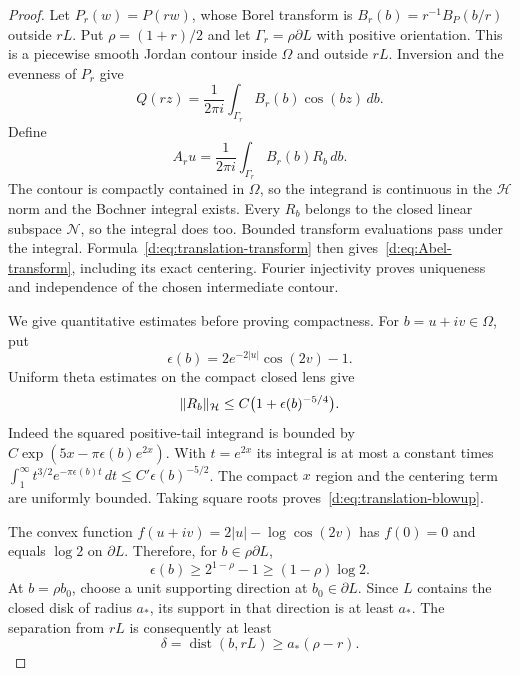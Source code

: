 \documentclass[11pt,a4paper]{article}
\numberwithin{equation}{section}
\theoremstyle{definition}\newtheorem{definition}[theorem]{Definition}
\theoremstyle{remark}\newtheorem{remark}[theorem]{Remark}
\newcommand{\Hh}{\mathcal H}\newcommand{\Hw}{\mathcal H}
\newcommand{\Nn}{\mathcal N}\newcommand{\Ii}{\mathcal I}\newcommand{\Zz}{\mathcal Z}
\begin{document}
\begin{proof}
Let $P_r(w)=P(rw)$, whose Borel transform is
$B_r(b)=r^{-1}B_P(b/r)$ outside $rL$. Put $\rho=(1+r)/2$ and let
$\Gamma_r=\rho\partial L$ with positive orientation. This is a piecewise smooth Jordan contour inside $\Omega$ and outside $rL$. Inversion and the evenness of $P_r$ give
\[
 Q(rz)=\frac1{2\pi i}\int_{\Gamma_r}B_r(b)\cos(bz)\,db.
\]
Define
\begin{equation}\label{d:eq:Abel-Bochner}
 A_ru=\frac1{2\pi i}\int_{\Gamma_r}B_r(b)R_b\,db.
\end{equation}
The contour is compactly contained in $\Omega$, so the integrand is continuous in the $\Hh$ norm and the Bochner integral exists. Every $R_b$ belongs to the closed linear subspace $\Nn$, so the integral does too. Bounded transform evaluations pass under the integral. Formula~\eqref{d:eq:translation-transform} then gives~\eqref{d:eq:Abel-transform}, including its exact centering. Fourier injectivity proves uniqueness and independence of the chosen intermediate contour.

We give quantitative estimates before proving compactness. For $b=u+iv\in\Omega$, put
\[
 \epsilon(b)=2e^{-2|u|}\cos(2v)-1.
\]
Uniform theta estimates on the compact closed lens give
\begin{equation}\label{d:eq:translation-blowup}
 \norm{R_b}_{\Hh}\le C\bigl(1+\epsilon(b)^{-5/4}\bigr).
\end{equation}
Indeed the squared positive-tail integrand is bounded by
$C\exp(5x-\pi\epsilon(b)e^{2x})$. With $t=e^{2x}$ its integral is at most a constant times
$\int_1^\infty t^{3/2}e^{-\pi\epsilon(b)t}\,dt
 \le C'\epsilon(b)^{-5/2}$.
The compact $x$ region and the centering term are uniformly bounded. Taking square roots proves~\eqref{d:eq:translation-blowup}.

The convex function $f(u+iv)=2|u|-\log\cos(2v)$ has $f(0)=0$ and equals $\log2$ on $\partial L$. Therefore, for $b\in\rho\partial L$,
\begin{equation}\label{d:eq:radial-epsilon}
 \epsilon(b)\ge 2^{1-\rho}-1\ge(1-\rho)\log2.
\end{equation}
At $b=\rho b_0$, choose a unit supporting direction at $b_0\in\partial L$. Since $L$ contains the closed disk of radius $a_*$, its support in that direction is at least $a_*$. The separation from $rL$ is consequently at least
\begin{equation}\label{d:eq:contour-separation}
 \delta=\operatorname{dist}(b,rL)\ge a_*(\rho-r).
\end{equation}


\end{proof}
\end{document}

